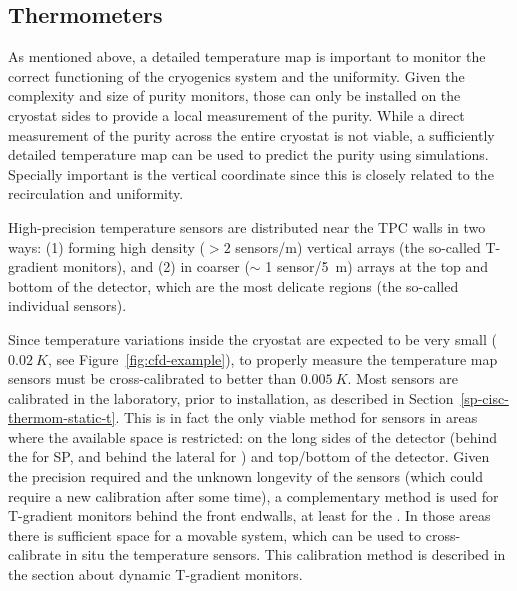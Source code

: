 \subsection{Thermometers}
\label{sec:fdgen-slow-cryo-therm}

As mentioned above, a detailed \threed temperature map is important to monitor the correct functioning of the cryogenics system and the \lar uniformity.
Given the complexity and size of purity monitors, those can only be installed on the cryostat sides to provide a local measurement of
the \lar purity. While a direct measurement of the \lar purity across the entire cryostat is not viable, a sufficiently detailed \threed temperature map
can be used to predict the \lar purity using  simulations. Specially important is the vertical coordinate since this is closely related to
the \lar recirculation and uniformity. 

High-precision temperature sensors are distributed near the TPC walls in two ways:
(1) forming high density (\(>2\) sensors/\si{m}) vertical arrays (the so-called T-gradient monitors), and (2) in coarser ($\sim$ 1 sensor/\SI{5}{m}) \twod arrays 
at the top and bottom of the detector, which are the most delicate regions (the so-called individual sensors).   

Since temperature variations inside the cryostat are expected to be very small ($\SI{0.02}{K}$, see Figure~\ref{fig:cfd-example}), to properly measure the \threed temperature map 
sensors must be cross-calibrated to better than $\SI{0.005}{K}$. Most sensors are calibrated in the laboratory, prior to installation,
as described in Section~\ref{sp-cisc-thermom-static-t}.  This is in fact the only viable method for sensors in areas where the available space is restricted: on the long sides of the detector
(behind the  for SP, and behind the lateral %
 for \dual) and top/bottom of the detector.
Given the precision required and the unknown longevity of the sensors (which could require a new calibration after some time), a complementary method
is used for T-gradient monitors behind the front endwalls, at least for the .
In those areas there is sufficient space for a movable system, which can be used to cross-calibrate in situ
the temperature sensors. This calibration method is described in the section about dynamic T-gradient monitors. 

